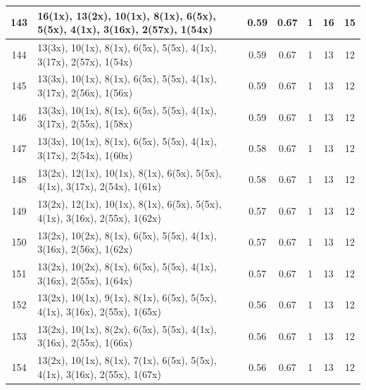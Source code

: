 \begin{small}
\begin{longtable}{|c|p{4cm}|c|c|c|c|c|}
  143 & 16(1x), 13(2x), 10(1x), 8(1x), 6(5x), 5(5x), 4(1x), 3(16x), 2(57x), 1(54x) & \cellcolor{colorOK}  0.59 & \cellcolor{colorOK} 0.67 & 1 & 16 & \cellcolor{colorBad} 15 \\   \hline
  144 & 13(3x), 10(1x), 8(1x), 6(5x), 5(5x), 4(1x), 3(17x), 2(57x), 1(54x) & \cellcolor{colorOK}  0.59 & \cellcolor{colorOK} 0.67 & 1 & 13 & \cellcolor{colorGood} 12 \\   \hline
  145 & 13(3x), 10(1x), 8(1x), 6(5x), 5(5x), 4(1x), 3(17x), 2(56x), 1(56x) & \cellcolor{colorOK}  0.59 & \cellcolor{colorOK} 0.67 & 1 & 13 & \cellcolor{colorGood} 12 \\   \hline
  146 & 13(3x), 10(1x), 8(1x), 6(5x), 5(5x), 4(1x), 3(17x), 2(55x), 1(58x) & \cellcolor{colorOK}  0.59 & \cellcolor{colorOK} 0.67 & 1 & 13 & \cellcolor{colorGood} 12 \\   \hline
  147 & 13(3x), 10(1x), 8(1x), 6(5x), 5(5x), 4(1x), 3(17x), 2(54x), 1(60x) & \cellcolor{colorOK}  0.58 & \cellcolor{colorOK} 0.67 & 1 & 13 & \cellcolor{colorGood} 12 \\   \hline
  148 & 13(2x), 12(1x), 10(1x), 8(1x), 6(5x), 5(5x), 4(1x), 3(17x), 2(54x), 1(61x) & \cellcolor{colorOK}  0.58 & \cellcolor{colorOK} 0.67 & 1 & 13 & \cellcolor{colorGood} 12 \\   \hline
  149 & 13(2x), 12(1x), 10(1x), 8(1x), 6(5x), 5(5x), 4(1x), 3(16x), 2(55x), 1(62x) & \cellcolor{colorOK}  0.57 & \cellcolor{colorOK} 0.67 & 1 & 13 & \cellcolor{colorGood} 12 \\   \hline
  150 & 13(2x), 10(2x), 8(1x), 6(5x), 5(5x), 4(1x), 3(16x), 2(56x), 1(62x) & \cellcolor{colorOK}  0.57 & \cellcolor{colorOK} 0.67 & 1 & 13 & \cellcolor{colorGood} 12 \\   \hline
  151 & 13(2x), 10(2x), 8(1x), 6(5x), 5(5x), 4(1x), 3(16x), 2(55x), 1(64x) & \cellcolor{colorOK}  0.57 & \cellcolor{colorOK} 0.67 & 1 & 13 & \cellcolor{colorGood} 12 \\   \hline
  152 & 13(2x), 10(1x), 9(1x), 8(1x), 6(5x), 5(5x), 4(1x), 3(16x), 2(55x), 1(65x) & \cellcolor{colorOK}  0.56 & \cellcolor{colorOK} 0.67 & 1 & 13 & \cellcolor{colorGood} 12 \\   \hline
  153 & 13(2x), 10(1x), 8(2x), 6(5x), 5(5x), 4(1x), 3(16x), 2(55x), 1(66x) & \cellcolor{colorOK}  0.56 & \cellcolor{colorOK} 0.67 & 1 & 13 & \cellcolor{colorGood} 12 \\   \hline
  154 & 13(2x), 10(1x), 8(1x), 7(1x), 6(5x), 5(5x), 4(1x), 3(16x), 2(55x), 1(67x) & \cellcolor{colorOK}  0.56 & \cellcolor{colorOK} 0.67 & 1 & 13 & \cellcolor{colorGood} 12 \\   \hline

\end{longtable}
\end{small}
